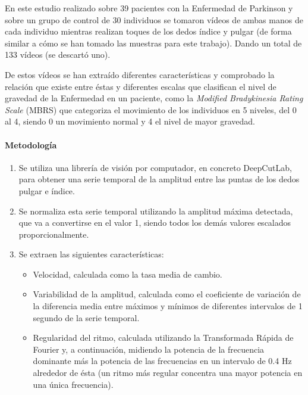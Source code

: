 En este estudio \cite{williams2020discerning} realizado sobre 39 pacientes con
la Enfermedad de Parkinson y sobre un grupo de control de 30 individuos se
tomaron vídeos de ambas manos de cada individuo mientras realizan toques de los
dedos índice y pulgar (de forma similar a cómo se han tomado las muestras para
este trabajo). Dando un total de 133 vídeos (se descartó uno).

De estos vídeos se han extraído diferentes características y comprobado la
relación que existe entre éstas y diferentes escalas que clasifican el nivel de
gravedad de la Enfermedad en un paciente, como la \textit{Modified Bradykinesia
Rating Scale} (MBRS) que categoriza el movimiento de los individuos en 5
niveles, del 0 al 4, siendo 0 un movimiento normal y 4 el nivel de mayor
gravedad.


\paragraph{Metodología}

\begin{enumerate}
    \item Se utiliza una librería de visión por computador, en concreto
          DeepCutLab, para obtener una serie temporal de la amplitud entre las
          puntas de los dedos pulgar e índice.
    \item Se normaliza esta serie temporal utilizando la amplitud máxima
          detectada, que va a convertirse en el valor 1, siendo todos los demás
          valores escalados proporcionalmente.
    \item Se extraen las siguientes características:
          \begin{itemize}
              \item Velocidad, calculada como la tasa media de cambio.
              \item Variabilidad de la amplitud, calculada como el coeficiente
                    de variación de la diferencia media entre máximos y mínimos
                    de diferentes intervalos de 1 segundo de la serie temporal.
              \item Regularidad del ritmo, calculada utilizando la Transformada
                    Rápida de Fourier y, a continuación, midiendo la potencia de
                    la frecuencia dominante más la potencia de las frecuencias
                    en un intervalo de 0.4 Hz alrededor de ésta (un ritmo más
                    regular concentra una mayor potencia en una única
                    frecuencia).
          \end{itemize}
\end{enumerate}


